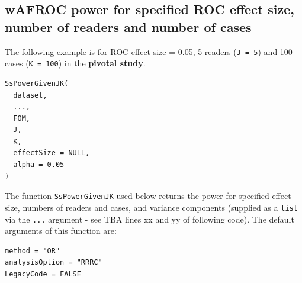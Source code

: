 \documentclass[
]{book}
\newenvironment{Shaded}{\begin{snugshade}}{\end{snugshade}}
\newcommand{\AttributeTok}[1]{\textcolor[rgb]{0.77,0.63,0.00}{#1}}
\newcommand{\FunctionTok}[1]{\textcolor[rgb]{0.00,0.00,0.00}{#1}}
\newcommand{\NormalTok}[1]{#1}
\newcommand{\OtherTok}[1]{\textcolor[rgb]{0.56,0.35,0.01}{#1}}
\newcommand{\SpecialCharTok}[1]{\textcolor[rgb]{0.00,0.00,0.00}{#1}}
\newcommand{\StringTok}[1]{\textcolor[rgb]{0.31,0.60,0.02}{#1}}
\begin{document}
\begin{Shaded}
\end{Shaded}

\hypertarget{wafroc-power-for-specified-roc-effect-size-number-of-readers-and-number-of-cases}{%
\subsection{wAFROC power for specified ROC effect size, number of readers and number of cases}\label{wafroc-power-for-specified-roc-effect-size-number-of-readers-and-number-of-cases}}

The following example is for ROC effect size = 0.05, 5 readers (\texttt{J\ =\ 5}) and 100 cases (\texttt{K\ =\ 100}) in the \textbf{pivotal study}.

\begin{verbatim}
SsPowerGivenJK(
  dataset,
  ...,
  FOM,
  J,
  K,
  effectSize = NULL,
  alpha = 0.05
)
\end{verbatim}

The function \texttt{SsPowerGivenJK} used below returns the power for specified effect size, numbers of readers and cases, and variance components (supplied as a \texttt{list} via the \texttt{...} argument - see TBA lines xx and yy of following code). The default arguments of this function are:

\begin{verbatim}
method = "OR" 
analysisOption = "RRRC" 
LegacyCode = FALSE
\end{verbatim}
\end{document}
